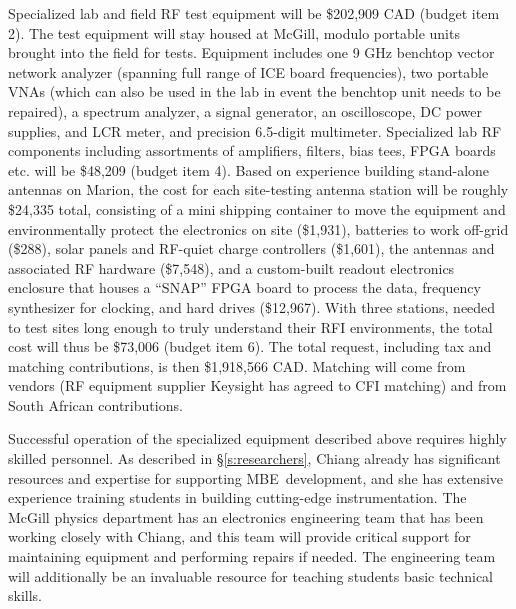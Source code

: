 \documentclass[11pt]{article}
\newcommand{\mbe}{{\rm MBE}}
\begin{document}
Specialized lab and field RF test equipment will be \$202,909 CAD
(budget item 2).  The test equipment will stay housed at McGill,
modulo portable units brought into the field for tests.  Equipment
includes one 9 GHz benchtop vector network analyzer (spanning full range of ICE board
frequencies), two portable VNAs (which can also be used in the lab in
event the benchtop unit needs to be repaired), a spectrum analyzer, a
signal generator, an oscilloscope, DC power supplies, and LCR meter,
and precision 6.5-digit multimeter.
Specialized lab RF components including assortments of amplifiers,
filters, bias tees, FPGA boards etc. will be \$48,209 (budget item 4).
Based on experience building stand-alone antennas on Marion, the cost
for each site-testing antenna station will be roughly \$24,335 total,
consisting of a mini shipping container to move the equipment and
environmentally protect the electronics on site (\$1,931), batteries
to work off-grid (\$288), solar panels and RF-quiet charge controllers
(\$1,601), the antennas and associated RF hardware (\$7,548), and a
custom-built readout electronics enclosure that houses a ``SNAP'' FPGA
board to process the data, frequency synthesizer for clocking, and
hard drives (\$12,967).  With three stations, needed to test sites
long enough to truly understand their RFI environments, the total cost
will thus be \$73,006 (budget item 6).
The total request, including tax and matching contributions, is then \$1,918,566
CAD.  Matching will come from vendors (RF equipment supplier Keysight
has agreed to CFI matching) and from South African contributions.  

Successful operation of the specialized equipment described above
requires highly skilled personnel.  As described in
\S\ref{s:researchers}, Chiang already has significant resources and
expertise for supporting \mbe\ development, and she has extensive
experience training students in building cutting-edge instrumentation.
The McGill physics department has an electronics engineering team that
has been working closely with Chiang, and this team will provide
critical support for maintaining equipment and performing repairs if
needed.  The engineering team will additionally be an invaluable
resource for teaching students basic technical skills.
\end{document}
